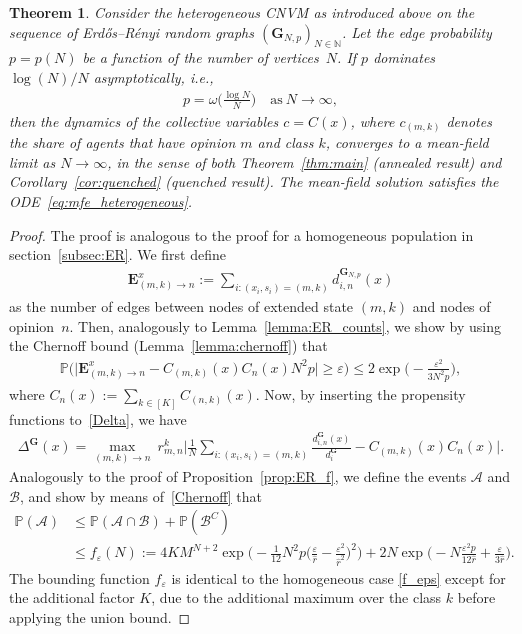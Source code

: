 \documentclass[a4paper,
               10pt,
               pdftex,
               normalheadings,
               headsepline,
               footsepline,
               headinclude,
               footinclude,
               DIV=14,
               abstracton]
{scrartcl}
\newtheorem{theorem}{Theorem}[section]
\newcommand{\rv}[1]{\bm{#1}}
\newcommand{\review}[1]{{#1}}
\begin{document}
\begin{theorem}
Consider the heterogeneous CNVM as introduced above on the sequence of Erd\H{o}s--Rényi random graphs $(\rv{G}_{N, p})_{N\in\mathbb{N}}$.
Let the edge probability $p=p(N)$ be a function of the number of vertices~$N$.
If $p$ dominates $\log(N)/N$ asymptotically, i.e.,
\begin{align}
    p = \omega\Big(\frac{\log N}{N}\Big) \quad \text{as}\ N \to \infty,
\end{align}
then the dynamics of the collective variables $c = C(x)$, where $c_{(m,k)}$ denotes the share of agents that have opinion $m$ and class $k$, converges to a mean-field limit as $N \to \infty$, \review{in the sense of both Theorem~\ref{thm:main} (annealed result) and Corollary~\ref{cor:quenched} (quenched result)}. The mean-field solution satisfies the ODE~\eqref{eq:mfe_heterogeneous}.
\end{theorem}
\begin{proof}
    The proof is analogous to the proof for a homogeneous population in section~\ref{subsec:ER}.
    We first define
    \begin{align}
        \rv{E}^x_{(m,k)\to n} := \sum_{i: (x_i, s_i) = (m, k)} d_{i, n}^{\rv{G}_{N,p}}(x)
    \end{align}
    as the number of edges between nodes of extended state $(m, k)$ and nodes of opinion~$n$.
    Then, analogously to Lemma~\ref{lemma:ER_counts}, we show by using the Chernoff bound (Lemma~\ref{lemma:chernoff}) that
    \begin{align}\label{Chernoff}
    \mathbb{P}\Big(\Big\lvert \rv{E}^x_{(m,k)\to n} - C_{(m,k)}(x) C_n(x) N^2 p \Big\rvert \geq \varepsilon\Big) \leq 2 \exp\Big(-\frac{\varepsilon^2}{3 N^2 p}\Big),
    \end{align}
    where $C_n(x) := \sum_{k \in [K]} C_{(n, k)}(x)$.
    Now, by inserting the propensity functions to~\eqref{Delta}, we have
    \begin{align}
        \Delta^{\rv{G}}(x) = \max_{(m,k)\to n}\  r^k_{m,n} \Big\lvert \frac{1}{N} \sum_{i : (x_i, s_i) = (m,k)} \frac{d^{\rv{G}}_{i,n}(x)}{d^{\rv{G}}_i} - C_{(m,k)}(x) C_n(x) \Big\rvert.
    \end{align}
    Analogously to the proof of Proposition~\ref{prop:ER_f}, we define the events $\mathcal{A}$ and $\mathcal{B}$, and show by means of~\eqref{Chernoff} that
    \begin{align}
        \mathbb{P}(\mathcal{A}) &\leq \mathbb{P}(\mathcal{A} \cap \mathcal{B}) + \mathbb{P}(\mathcal{B}^C)\\
        &\leq f_\varepsilon(N) := 4 K M^{N+2} \exp\Big(-\frac{1}{12} N^2 p \Big(\frac{\varepsilon}{\hat{r}} - \frac{\varepsilon^2}{\hat{r}^2}\Big)^2 \Big) + 2 N \exp\Big(-N \frac{\varepsilon^2 p}{12 \hat{r}} + \frac{ \varepsilon}{3\hat{r}}\Big).
    \end{align}
    The bounding function $f_\varepsilon$ is identical to the homogeneous case \eqref{f_eps} except for the additional factor $K$, due to the additional maximum over the class $k$ before applying the union bound.
\end{proof}
\end{document}
